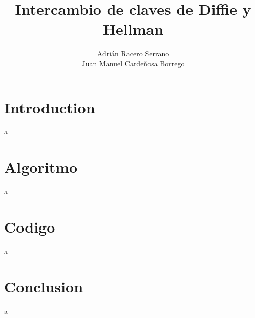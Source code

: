 \documentclass[11pt]{article}
\title{\textbf{Intercambio de claves de Diffie y Hellman}}
\author{Adrián Racero Serrano\\Juan Manuel Cardeñosa Borrego}
\date{}
\begin{document}
\maketitle
\thispagestyle{empty}

\tableofcontents 

\section{Introduction}
a

\section{Algoritmo}
a

\section{Codigo}
a

\section{Conclusion}
a
\end{document}
